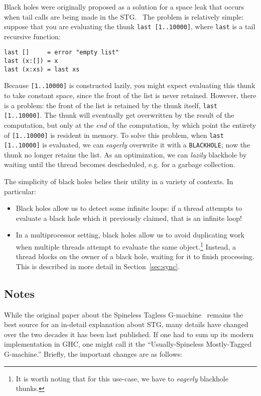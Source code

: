Black holes were originally proposed as a solution for a space leak that
occurs when tail calls are being made in the STG.~\cite{Jones2008} The
problem is relatively simple: suppose that you are evaluating the thunk \verb|last [1..10000]|,
where \verb|last| is a tail recursive function:

\begin{verbatim}
last []     = error "empty list"
last (x:[]) = x
last (x:xs) = last xs
\end{verbatim}

Because \verb|[1..10000]| is constructed lazily, you might expect
evaluating this thunk to take constant space, since the front of the
list is never retained.  However, there is a problem: the front of the
list is retained by the thunk itself, \verb|last [1..10000]|.  The thunk
will eventually get overwritten by the result of the computation, but
only at the \emph{end} of the computation, by which point the entirety
of \verb|[1..10000]| is resident in memory.  To solve this problem, when
\verb|last [1..10000]| is evaluated, we can \emph{eagerly} overwrite it
with a \verb|BLACKHOLE|; now the thunk no longer retains the list.  As
an optimization, we can \emph{lazily} blackhole by waiting until the
thread becomes descheduled, e.g. for a garbage collection.

The simplicity of black holes belies their utility in a variety of contexts.
In particular:

\begin{itemize}
\item Black holes allow us to detect some infinite loops: if a thread attempts
    to evaluate a black hole which it previously claimed, that is an infinite loop!
\item In a multiprocessor setting, black holes allow us to avoid duplicating work when multiple
    threads attempt to evaluate the same object.\footnote{It is worth noting that for this use-case, we have to \emph{eagerly} blackhole thunks.}  Instead, a thread blocks on the owner
    of a black hole, waiting for it to finish processing.  This is described in more
    detail in Section~\ref{sec:sync}.
\end{itemize}

\subsection{Notes}


While the original paper about the Spineless Tagless
G-machine~\cite{PeytonJones1992} remains the best source for an
in-detail explanation about STG, many details have changed over the two
decades it has been last published.  If one had to sum up its modern
implementation in GHC, one might call it the ``Usually-Spineless
Mostly-Tagged G-machine.''  Briefly, the important changes are as
follows:

